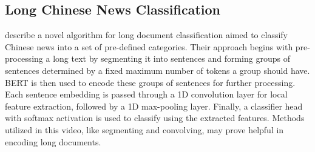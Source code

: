 \subsection*{Long Chinese News Classification}

\citet{chen2022long} describe a novel algorithm for long document classification
aimed to classify Chinese news into a set of pre-defined categories.
Their approach begins with pre-processing a long text by segmenting it into sentences
and forming groups of sentences determined by a fixed maximum number of tokens a
group should have.
BERT is then used to encode these groups of sentences for further processing.
Each sentence embedding is passed through a 1D convolution layer for local feature
extraction, followed by a 1D max-pooling layer.
Finally, a classifier head with softmax activation is used to classify using the
extracted features.
Methods utilized in this video, like segmenting and convolving, may prove helpful in
encoding long documents.
